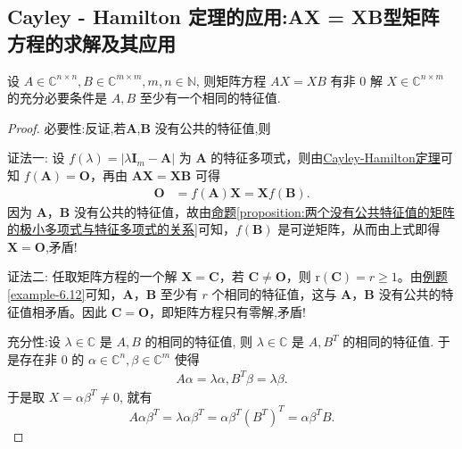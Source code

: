 \documentclass[../../main.tex]{subfiles}
\begin{document}
\subsection{Cayley - Hamilton 定理的应用:AX = XB型矩阵方程的求解及其应用}

\begin{proposition}[$AX=XB$经典结论]\label{AX=XB相关命题1}
设 $A \in \mathbb{C}^{n \times n}, B \in \mathbb{C}^{m \times m}, m, n \in \mathbb{N}$, 则矩阵方程 $AX=XB$ 有非 $0$ 解 $X \in \mathbb{C}^{n \times m}$ 的充分必要条件是 $A, B$ 至少有一个相同的特征值.
\end{proposition}
\begin{proof}
{\heiti 必要性:}反证,若\(\boldsymbol{A}\),\(\boldsymbol{B}\) 没有公共的特征值,则

{\color{blue}证法一:}
设 \(f(\lambda)=|\lambda\boldsymbol{I}_m - \boldsymbol{A}|\) 为 \(\boldsymbol{A}\) 的特征多项式，则由\hyperref[theorem:Cayley-Hamilton定理]{Cayley-Hamilton定理}可知 \(f(\boldsymbol{A})=\boldsymbol{O}\)，再由 \(\boldsymbol{AX = XB}\) 可得
\begin{align*}
\boldsymbol{O}&=f(\boldsymbol{A})\boldsymbol{X}=\boldsymbol{X}f(\boldsymbol{B}).
\end{align*}
因为 \(\boldsymbol{A}\)，\(\boldsymbol{B}\) 没有公共的特征值，故由\hyperref[proposition:两个没有公共特征值的矩阵的极小多项式与特征多项式的关系]{命题\ref{proposition:两个没有公共特征值的矩阵的极小多项式与特征多项式的关系}}可知，\(f(\boldsymbol{B})\) 是可逆矩阵，从而由上式即得 \(\boldsymbol{X = O}\),矛盾!

{\color{blue}证法二:}
任取矩阵方程的一个解 \(\boldsymbol{X = C}\)，若 \(\boldsymbol{C\neq O}\)，则 \(\mathrm{r}(\boldsymbol{C}) = r\geqslant  1\)。由\hyperref[example-6.12]{例题\ref{example-6.12}}可知，\(\boldsymbol{A}\)，\(\boldsymbol{B}\) 至少有 \(r\) 个相同的特征值，这与 \(\boldsymbol{A}\)，\(\boldsymbol{B}\) 没有公共的特征值相矛盾。因此 \(\boldsymbol{C = O}\)，即矩阵方程只有零解,矛盾!

{\heiti 充分性:}设 $\lambda \in \mathbb{C}$ 是 $A, B$ 的相同的特征值, 则 $\lambda \in \mathbb{C}$ 是 $A, B^T$ 的相同的特征值. 于是存在非 $0$ 的 $\alpha \in \mathbb{C}^n, \beta \in \mathbb{C}^m$ 使得
\begin{align*}
A\alpha = \lambda\alpha, B^T\beta = \lambda\beta.
\end{align*}
于是取 $X = \alpha\beta^T \neq 0$, 就有
$$A\alpha\beta^T = \lambda\alpha\beta^T = \alpha\beta^T (B^T)^T = \alpha\beta^T B.$$
\end{proof}
\end{document}
